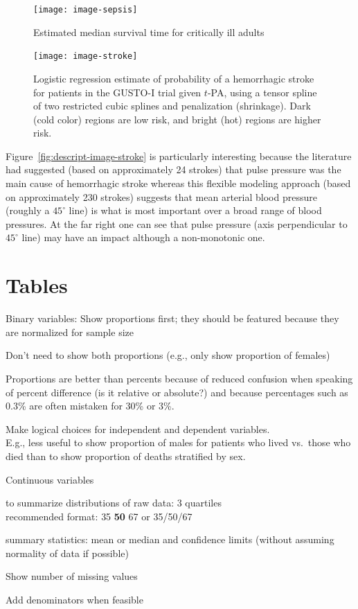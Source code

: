 \begin{figure}[!htbp]\leavevmode%
 \centerline{\texttt{[image: image-sepsis]}}
 \caption{Estimated median survival time for critically ill adults}
 \end{figure}

\begin{figure}[!htbp]\leavevmode%
 \centerline{\texttt{[image: image-stroke]}}
 \caption[Probability of hemorrhagic stroke vs.\ blood
 pressures]{Logistic regression estimate of probability of a
   hemorrhagic stroke for patients in the GUSTO-I trial given $t$-PA,
   using a tensor spline of two restricted cubic splines and
   penalization (shrinkage).  Dark (cold color) regions are low risk,
   and bright (hot) regions are higher risk.}
 \end{figure}
 
 Figure~\ref{fig:descript-image-stroke} is particularly interesting
 because the literature had suggested (based on approximately 24
 strokes) that pulse pressure was the main
 cause of hemorrhagic stroke whereas this flexible modeling approach
 (based on approximately 230 strokes)
 suggests that mean arterial blood pressure (roughly a $45^\circ$ line)
 is what is most important 
 over a broad range of blood pressures.  At the far right one can see
 that pulse pressure (axis perpendicular to $45^\circ$ line) may have
 an impact although a non-monotonic one.

\clearpage
\section{Tables}
\bi
\item Binary variables: Show proportions first; they should be
  featured because they are normalized for sample size
  \bi
  \item Don't need to show both proportions (e.g., only show
    proportion of females)
  \item Proportions are better than percents because of reduced
    confusion when speaking of percent difference (is it relative or
    absolute?) and because percentages such as 0.3\% are often
    mistaken for 30\% or 3\%.
  \ei
\item Make logical choices for independent and dependent variables. \\
 E.g., less useful to show proportion of males for patients who lived
 vs.\ those who died than to show proportion of deaths stratified by
 sex.
\item Continuous variables
 \bi
 \item to summarize distributions of raw data: 3 quartiles \\
   recommended format: {\small 35} \textbf{50} {\small 67} or
   35/50/67
 \item summary statistics: mean or median and confidence limits
   (without assuming normality of data if possible)
 \ei
\item Show number of missing values
\item Add denominators when feasible
\ei

